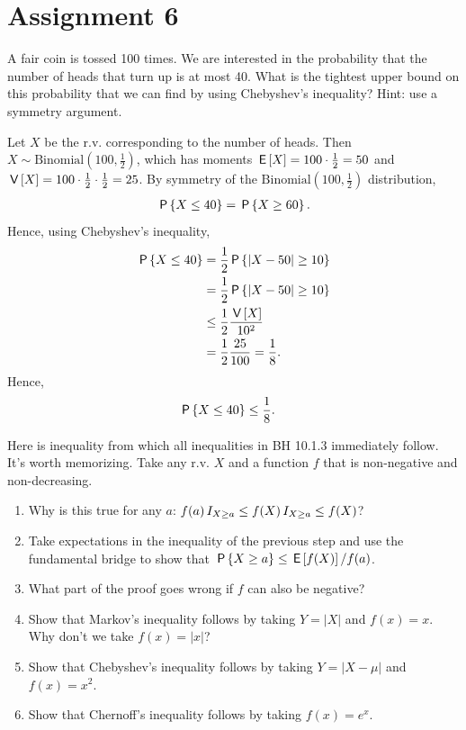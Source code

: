\documentclass[../../assignments/assignments]{subfiles}
\begin{document}
\section{Assignment 6}


\begin{exercise}
A fair coin is tossed 100 times. We are interested in the probability that the number of heads that turn up is at most 40. What is the tightest upper bound on this probability that we can find by using Chebyshev's inequality? Hint: use a symmetry argument.
\begin{solution}
Let $X$ be the r.v. corresponding to the number of heads. Then $X\sim \text{Binomial}\left(100,\frac12\right)$, which has moments $\E{X} = 100 \cdot \frac{1}{2} = 50$ and $\V{X} = 100 \cdot \frac{1}{2} \cdot \frac{1}{2} = 25$. By symmetry of the $\text{Binomial}\left(100,\frac12\right)$ distribution,
\begin{align}
    \P{ X \leq 40} = \P{ X \geq 60 }.
\end{align}
Hence, using Chebyshev's inequality,
\begin{align}
    \P{ X \leq 40} &= \frac{1}{2}  \P{ |X - 50| \geq 10 } \\
    &= \frac{1}{2} \P{ |X - 50| \geq 10 } \\
    &\leq \frac{1}{2} \frac{\V{X}}{10^2} \\
    &= \frac{1}{2} \frac{25}{100} = \frac{1}{8}.
\end{align}
Hence,
\begin{align}
    \P{ X \leq 40} &\leq \frac{1}{8}.
\end{align}
\end{solution}
\end{exercise}


\begin{exercise}
Here is inequality from which all inequalities in BH 10.1.3 immediately follow. It's worth memorizing.
Take any r.v. $X$ and a function $f$ that is non-negative and non-decreasing.
\begin{enumerate}
\item Why is this true for any $a$: $f(a) \1{X\geq a} \leq f(X) \1{X\geq a} \leq f(X)$?
\item Take expectations in the inequality of the previous step and use the fundamental bridge to show that $\P{X\geq a} \leq \E{f(X)}/f(a)$.
\item What part of the proof goes wrong if  $f$ can also be negative?
\item Show that Markov's inequality follows by taking $Y=|X|$ and  $f(x)=x$. Why don't we take $f(x) = |x|$?
\item Show that Chebyshev's inequality follows by taking $Y=|X-\mu|$ and $f(x)=x^2$.
\item Show that Chernoff's inequality follows by taking $f(x)=e^{x}$.
\end{enumerate}
\end{exercise}
\end{document}
